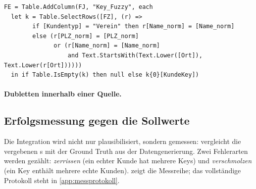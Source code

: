 \begin{lstlisting}[language=PowerQueryM, caption={Auswahl des Fuzzy-Treffers über die fachliche Nachregel (Auszug aus \pq{CRM\_k})}, label={lst:fuzzy}]
FE = Table.AddColumn(FJ, "Key_Fuzzy", each
  let k = Table.SelectRows([FZ], (r) =>
        if [Kundentyp] = "Verein" then r[Name_norm] = [Name_norm]
        else (r[PLZ_norm] = [PLZ_norm]
              or (r[Name_norm] = [Name_norm]
                  and Text.StartsWith(Text.Lower([Ort]), Text.Lower(r[Ort])))))
  in if Table.IsEmpty(k) then null else k{0}[KundeKey])
\end{lstlisting}

\paragraph{Dubletten innerhalb einer Quelle.} 

\subsection{Erfolgsmessung gegen die Sollwerte}\label{sec:erfolgsmessung}

Die Integration wird nicht nur plausibilisiert, sondern gemessen:  vergleicht die vergebenen s mit der Ground Truth aus der Datengenerierung. Zwei Fehlerarten werden gezählt: \emph{zerrissen} (ein echter Kunde hat mehrere Keys) und \emph{verschmolzen} (ein Key enthält mehrere echte Kunden).  zeigt die Messreihe; das vollständige Protokoll steht in \cref{app:messprotokoll}.

